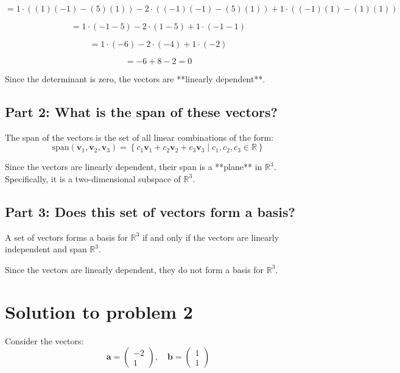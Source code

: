 \documentclass[11pt]{article}
\begin{document}
\[
= 1 \cdot \left( (1)(-1) - (5)(1) \right) - 2 \cdot \left( (-1)(-1) - (5)(1) \right) + 1 \cdot \left( (-1)(1) - (1)(1) \right)
\]

\[
= 1 \cdot (-1 - 5) - 2 \cdot (1 - 5) + 1 \cdot (-1 - 1)
\]

\[
= 1 \cdot (-6) - 2 \cdot (-4) + 1 \cdot (-2)
\]

\[
= -6 + 8 - 2 = 0
\]

Since the determinant is zero, the vectors are **linearly dependent**.

\newpage
\subsection{Part 2: What is the span of these vectors?}

The span of the vectors is the set of all linear combinations of the form:
\[
\text{span}(\mathbf{v}_1, \mathbf{v}_2, \mathbf{v}_3) = \left\{ c_1 \mathbf{v}_1 + c_2 \mathbf{v}_2 + c_3 \mathbf{v}_3 \mid c_1, c_2, c_3 \in \mathbb{R} \right\}
\]

Since the vectors are linearly dependent, their span is a **plane** in \( \mathbb{R}^3 \). Specifically, it is a two-dimensional subspace of \( \mathbb{R}^3 \).

\newpage
\subsection{Part 3: Does this set of vectors form a basis?}

A set of vectors forms a basis for \( \mathbb{R}^3 \) if and only if the vectors are linearly independent and span \( \mathbb{R}^3 \).

Since the vectors are linearly dependent, they do not form a basis for \( \mathbb{R}^3 \).




\newpage

\section{Solution to problem 2}

Consider the vectors:
\[
\mathbf{a} = \begin{pmatrix} -2 \\ 1 \end{pmatrix}, \quad \mathbf{b} = \begin{pmatrix} 1 \\ 1 \end{pmatrix}
\]
\end{document}
